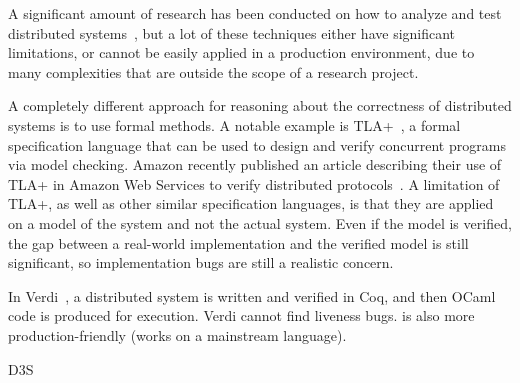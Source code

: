 A significant amount of research has been conducted on how to analyze and test distributed systems~\cite{lamport1994temporal, schuppan2004efficient, killian2007life, gupta2008diecast, yang2009modist}, but a lot of these techniques either have significant limitations, or cannot be easily applied in a production environment, due to many complexities that are outside the scope of a research project.

A completely different approach for reasoning about the correctness of distributed systems is to use formal methods.  A notable example is TLA+~\cite{lamport1994temporal}, a formal specification language that can be used to design and verify concurrent programs via model checking. Amazon recently published an article describing their use of TLA+ in Amazon Web Services to verify distributed protocols~\cite{newcombe2015aws}. A limitation of TLA+, as well as other similar specification languages, is that they are applied on a model of the system and not the actual system. Even if the model is verified, the gap between a real-world implementation and the verified model is still significant, so implementation bugs are still a realistic concern.

In Verdi~\cite{wilcox2015verdi}, a distributed system is written and verified in Coq, and then OCaml code is produced for execution. Verdi cannot find liveness bugs. \psharp is also more production-friendly (works on a mainstream language). 

D3S~\cite{liu2008d3s} 